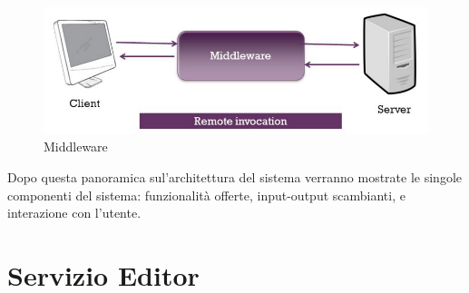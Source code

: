 \\
\begin{figure}[htb]
 \centering
 \includegraphics[width=1\linewidth]{images/chapter_architettura_sistema/as_middleware.png}\hfill
 \caption[Middleware]{Middleware}
 \label{fig:as_middleware}
\end{figure}

Dopo questa panoramica sul’architettura del sistema verranno mostrate le singole componenti del sistema: funzionalità offerte, input-output scambianti, e interazione con l’utente. 

\section{Servizio Editor}
\label{sec:chapter_architettura_sistema_il_servizio_editor}

